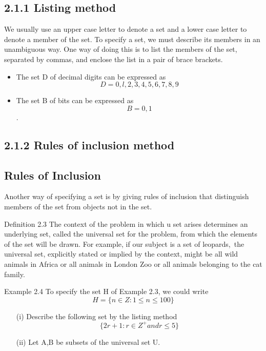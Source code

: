 \documentclass[12pt]{article}
\begin{document}
\smallskip 
\subsection{2.1.1 Listing method}
\smallskip 
We usually use an upper case letter to denote a set and a lower case letter to denote a member of
the set. To specify a set, we must describe its members in an unambiguous way. One way of doing
this is to list the members of the set, separated by commas, and enclose the list in a pair of brace
brackets.
\smallskip 
\smallskip 
\begin{itemize}
\item The set D of decimal digits can be expressed as
\[D = {0, l,2,3,4,5,6,7,8,9}\]
\item The set B of bits can be expressed as
\[B= {0,1}\]. 
\end{itemize}
\smallskip 

\subsection{2.1.2 Rules of inclusion method}
\smallskip 
\subsection{Rules of Inclusion}
Another way of specifying a set is by giving rules of inclusion that distinguish members of the
set from objects not in the set.

Definition 2.3 The context of the problem in which u set arises determines an underlying set,
called the universal set for the problem, from which the elements of the set will be drawn.
\smallskip 
\smallskip 
For example, if our subject is a set of leopards,~the universal set, explicitly stated or implied by the
context, might be all wild animals in Africa or all animals in London Zoo or all animals belonging
to the cat family.

Example 2.4 To specify the set H of Example 2.3, we could write
\[H=\{n \in Z : 1 \leq n \leq 100\} \]

\smallskip 




\begin{itemize}
	\item[(i)] Describe the following set by the listing method
	\[ \{ 2r+1 : r \in Z^{+} and r \leq 5  \} \]
	\item[(ii)] Let A,B be subsets of the universal set U.
	
\end{itemize}
\end{document}
